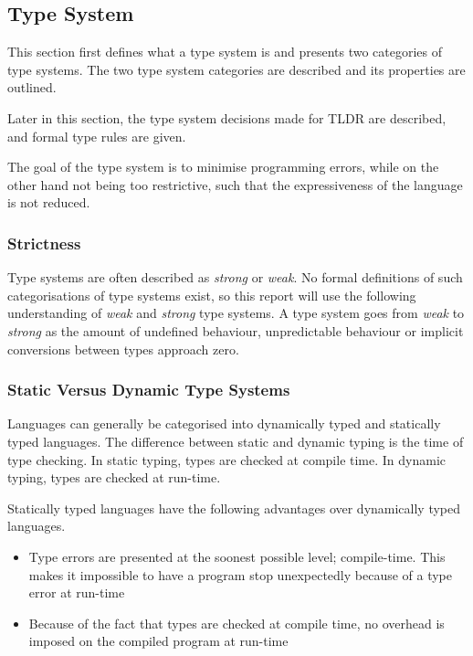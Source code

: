 \subsection{Type System}\label{typesys}

This section first defines what a type system is and presents two categories of type systems. The two type system categories are described and its properties are outlined.

Later in this section, the type system decisions made for TLDR are described, and formal type rules are given.


The goal of the type system is to minimise programming errors, while on the other hand not being too restrictive, such that the expressiveness of the language is not reduced. 

\subsubsection{Strictness}
Type systems are often described as \emph{strong} or \emph{weak}. No formal definitions of such categorisations of type systems exist, so this report will use the following understanding of \emph{weak} and \emph{strong} type systems. A type system goes from \emph{weak} to \emph{strong} as the amount of undefined behaviour, unpredictable behaviour or implicit conversions between types approach zero.

\subsubsection{Static Versus Dynamic Type Systems}
Languages can generally be categorised into dynamically typed and statically typed languages. The difference between static and dynamic typing is the time of type checking. In static typing, types are checked at compile time. In dynamic typing, types are checked at run-time.

Statically typed languages have the following advantages over dynamically typed languages.

\begin{itemize}
  \item Type errors are presented at the soonest possible level; compile-time. This makes it impossible to have a program stop unexpectedly because of a type error at run-time
  \item Because of the fact that types are checked at compile time, no overhead is imposed on the compiled program at run-time
\end{itemize}


